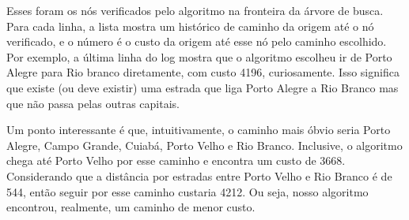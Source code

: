 Esses foram os nós verificados pelo algoritmo na fronteira da árvore de busca. Para cada linha, a lista mostra um histórico de caminho da origem até o nó verificado, e o número é o custo da origem até esse nó pelo caminho escolhido.
Por exemplo, a última linha do log mostra que o algoritmo escolheu ir de Porto Alegre para Rio branco diretamente, com custo 4196, curiosamente. Isso significa que existe (ou deve existir) uma estrada que liga Porto Alegre a Rio Branco mas que não passa pelas outras capitais.

Um ponto interessante é que, intuitivamente, o caminho mais óbvio seria Porto Alegre, Campo Grande, Cuiabá, Porto Velho e Rio Branco. Inclusive, o algoritmo chega até Porto Velho por esse caminho e encontra um custo de 3668. Considerando que a distância por estradas entre Porto Velho e Rio Branco é de 544, então seguir por esse caminho custaria 4212.
Ou seja, nosso algoritmo encontrou, realmente, um caminho de menor custo.
